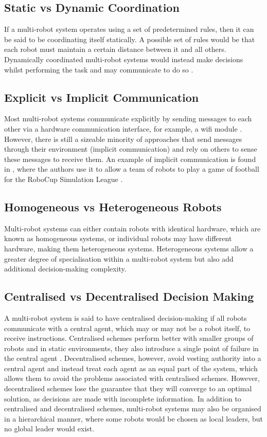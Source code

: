 \subsection{Static vs Dynamic Coordination}
If a multi-robot system operates using a set of predetermined rules, then it can be said to be coordinating itself statically. A possible set of rules would be that each robot must maintain a certain distance between it and all others. Dynamically coordinated multi-robot systems would instead make decisions whilst performing the task and may communicate to do so \cite{MultiRobotCoordinationSurvey}.

\subsection{Explicit vs Implicit Communication}
Most multi-robot systems communicate explicitly by sending messages to each other via a hardware communication interface, for example, a wifi module \cite{MultiRobotCoordinationSurvey}. However, there is still a sizeable minority of approaches that send messages through their environment (implicit communication) and rely on others to sense these messages to receive them. An example of implicit communication is found in \cite{FootballRobots}, where the authors use it to allow a team of robots to play a game of football for the RoboCup Simulation League \cite{RoboCup}.

\subsection{Homogeneous vs Heterogeneous Robots}
Multi-robot systems can either contain robots with identical hardware, which are known as homogeneous systems, or individual robots may have different hardware, making them heterogeneous systems. Heterogeneous systems allow a greater degree of specialisation within a multi-robot system but also add additional decision-making complexity.

\subsection{Centralised vs Decentralised Decision Making}
A multi-robot system is said to have centralised decision-making if all robots communicate with a central agent, which may or may not be a robot itself, to receive instructions. Centralised schemes perform better with smaller groups of robots and in static environments, they also introduce a single point of failure in the central agent \cite{MultiRobotCoordinationSurvey}. Decentralised schemes, however, avoid vesting authority into a central agent and instead treat each agent as an equal part of the system, which allows them to avoid the problems associated with centralised schemes. However, decentralised schemes lose the guarantee that they will converge to an optimal solution, as decisions are made with incomplete information. %
In addition to centralised and decentralised schemes, multi-robot systems may also be organised in a hierarchical manner, where some robots would be chosen as local leaders, but no global leader would exist.

